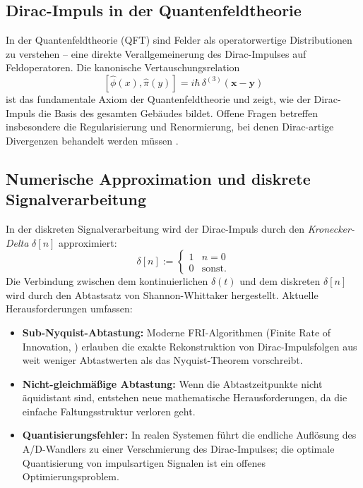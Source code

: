 ﻿\documentclass[a4paper,12pt]{article}
\theoremstyle{definition}
\begin{document}
\subsection{Dirac-Impuls in der Quantenfeldtheorie}

In der Quantenfeldtheorie (QFT) \cite{peskin1995introduction} sind Felder als
operatorwertige Distributionen zu verstehen -- eine direkte Verallgemeinerung des
Dirac-Impulses auf Feldoperatoren. Die kanonische Vertauschungsrelation
\[
[\hat{\phi}(x), \hat{\pi}(y)] = i\hbar\,\delta^{(3)}(\mathbf{x} - \mathbf{y})
\]
ist das fundamentale Axiom der Quantenfeldtheorie und zeigt, wie der Dirac-Impuls
die Basis des gesamten Geb\"audes bildet. Offene Fragen betreffen insbesondere
die Regularisierung und Renormierung, bei denen Dirac-artige Divergenzen behandelt
werden m\"ussen \cite{zinn-justin2002}.

\subsection{Numerische Approximation und diskrete Signalverarbeitung}

In der diskreten Signalverarbeitung \cite{oppenheim1999discrete} wird der Dirac-Impuls
durch den \emph{Kronecker-Delta} $\delta[n]$ approximiert:
\[
\delta[n] := \begin{cases} 1 & n = 0 \\ 0 & \text{sonst.} \end{cases}
\]
Die Verbindung zwischen dem kontinuierlichen $\delta(t)$ und dem diskreten $\delta[n]$
wird durch den Abtastsatz von Shannon-Whittaker \cite{shannon1949communication} hergestellt.
Aktuelle Herausforderungen umfassen:
\begin{itemize}
    \item \textbf{Sub-Nyquist-Abtastung:} Moderne FRI-Algorithmen (Finite Rate of Innovation,
          \cite{vetterli2002fri}) erlauben die exakte Rekonstruktion von Dirac-Impulsfolgen
          aus weit weniger Abtastwerten als das Nyquist-Theorem vorschreibt.
    \item \textbf{Nicht-gleichm\"a{\ss}ige Abtastung:} Wenn die Abtastzeitpunkte nicht
          \"aquidistant sind, entstehen neue mathematische Herausforderungen, da die
          einfache Faltungsstruktur verloren geht.
    \item \textbf{Quantisierungsfehler:} In realen Systemen f\"uhrt die endliche Aufl\"osung
          des A/D-Wandlers zu einer Verschmierung des Dirac-Impulses; die optimale Quantisierung
          von impulsartigen Signalen ist ein offenes Optimierungsproblem.
\end{itemize}
\end{document}

